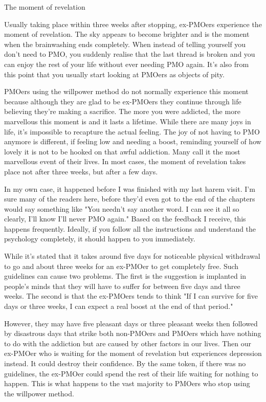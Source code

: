The moment of revelation

Usually taking place within three weeks after stopping, ex-PMOers experience the moment of revelation. The sky appears to become brighter and is the moment when the brainwashing ends completely. When instead of telling yourself you don't need to PMO, you suddenly realise that the last thread is broken and you can enjoy the rest of your life without ever needing PMO again. It's also from this point that you usually start looking at PMOers as objects of pity.

PMOers using the willpower method do not normally experience this moment because although they are glad to be ex-PMOers they continue through life believing they're making a sacrifice. The more you were addicted, the more marvellous this moment is and it lasts a lifetime. While there are many joys in life, it's impossible to recapture the actual feeling. The joy of not having to PMO anymore is different, if feeling low and needing a boost, reminding yourself of how lovely it is not to be hooked on that awful addiction. Many call it the most marvellous event of their lives. In most cases, the moment of revelation takes place not after three weeks, but after a few days. 

In my own case, it happened before I was finished with my last harem visit. I'm sure many of the readers here, before they'd even got to the end of the chapters would say something like "You needn't say another word. I can see it all so clearly, I'll know I'll never PMO again." Based on the feedback I receive, this happens frequently. Ideally, if you follow all the instructions and understand the psychology completely, it should happen to you immediately.

While it's stated that it takes around five days for noticeable physical withdrawal to go and about three weeks for an ex-PMOer to get completely free. Such guidelines can cause two problems. The first is the suggestion is implanted in people's minds that they will have to suffer for between five days and three weeks. The second is that the ex-PMOers tends to think "If I can survive for five days or three weeks, I can expect a real boost at the end of that period."

However, they may have five pleasant days or three pleasant weeks then followed by disastrous days that strike both non-PMOers and PMOers which have nothing to do with the addiction but are caused by other factors in our lives. Then our ex-PMOer who is waiting for the moment of revelation but experiences depression instead. It could destroy their confidence. By the same token, if there was no guidelines, the ex-PMOer could spend the rest of their life waiting for nothing to happen. This is what happens to the vast majority to PMOers who stop using the willpower method.

